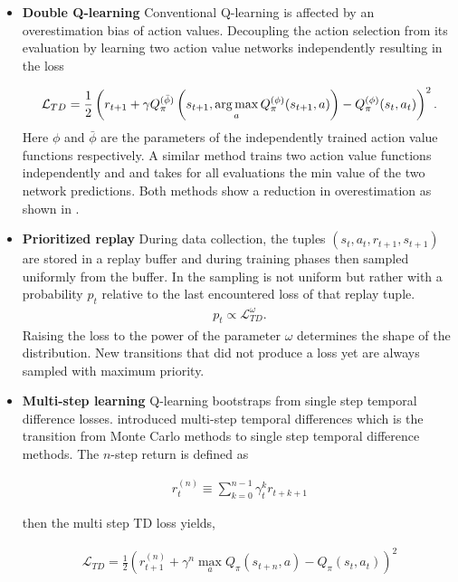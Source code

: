\begin{itemize}
	\item \textbf{Double Q-learning} \cite{DBLP:journals/corr/HasseltGS15} Conventional Q-learning is affected by an overestimation bias of action values. Decoupling the action selection from its evaluation by learning two action value networks independently resulting in the loss
	
	\begin{align}
		\mathcal{L}_{TD} = \frac{1}{2} \left(r_{t+1} + \gamma Q_{\pi}^{(\bar{\phi})} \left( s_{t+1}, \operatorname*{arg\,max}_{a}Q_{\pi}^{(\phi)}(s_{t+1}, a) \right) - Q_{\pi}^{(\phi)}(s_t, a_t)\right)^2\text{.}
	\end{align}
	Here $\phi$ and $\bar{\phi}$ are the parameters of the independently trained action value functions respectively. A similar method trains two action value functions independently and and takes for all evaluations the min value of the two network predictions. Both methods show a reduction in overestimation as shown in \cite{DBLP:journals/corr/HasseltGS15}.
	
	\item \textbf{Prioritized replay} During data collection, the tuples $(s_t, a_t, r_{t+1}, s_{t+1})$ are stored in a replay buffer and during training phases then sampled uniformly from the buffer. In \cite{schaul2015prioritized} the sampling is not uniform but rather with a probability $p_t$ relative to the last encountered loss of that replay tuple.
	\begin{align}
		p_t \propto \mathcal{L}_{TD} ^ \omega \text{.}
	\end{align}
	Raising the loss to the power of the parameter $\omega$ determines the shape of the distribution. New transitions that did not produce a loss yet are always sampled with maximum priority.
	
	\item \textbf{Multi-step learning} Q-learning bootstraps from single step temporal difference losses. \cite{SBQL} introduced multi-step temporal differences which is the transition from Monte Carlo methods to single step temporal difference methods. The $n$-step return is defined as 
	
	\begin{align}
		r_t^{(n)} \equiv \sum_{k=0}^{n-1} \gamma_t^{k} r_{t+k+1}
	\end{align}
	
	then the multi step TD loss yields,
	
	\begin{align}
		\mathcal{L}_{TD} = \frac{1}{2} \left(r_{t+1}^{(n)} + \gamma^{n} \max_{a}Q_{\pi}(s_{t+n}, a) - Q_{\pi}(s_t, a_t)\right)^2
	\end{align}
	

\end{itemize}
